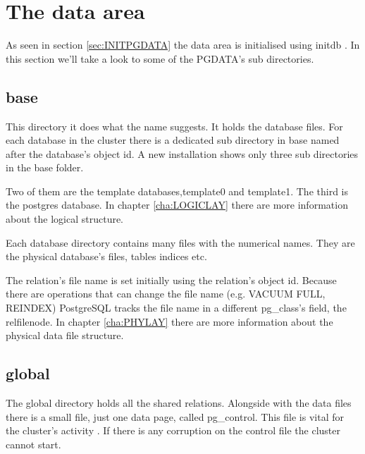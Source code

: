 \section{The data area}

\label{sec:PGDATA}

As seen in section \ref{sec:INITPGDATA} the data area is initialised using
initdb . In this section we'll take a look to some of the
PGDATA's sub directories.

\subsection{base}

\label{sub:BASE}

This directory it does what the name suggests. It holds the database files. For
each database in the cluster there is a dedicated sub directory in base named
after the database's object id. A new installation shows only three sub
directories in the base folder.\newline

Two of them are the template databases,template0 and template1. The third is
the postgres database. In chapter \ref{cha:LOGICLAY} there are more information about
the logical structure.\newline

Each database directory contains many files with the numerical names. They are
the physical database's files, tables indices etc.\newline

The relation's file name is set initially using the relation's object id.
Because there are operations that can change the file name (e.g. VACUUM FULL,
REINDEX) PostgreSQL tracks the file name in a different pg\_class's field, the
relfilenode. In chapter \ref{cha:PHYLAY} there are more information about the physical
data file structure.

\subsection{global}

The global directory holds all the shared relations. Alongside with the data
files there is a small file, just one data page, called pg\_control. This file
is vital for the cluster's activity . If there is any
corruption on the control file the cluster cannot start.

